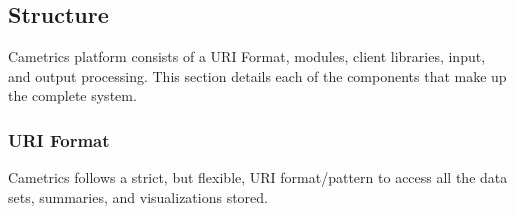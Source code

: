 \documentclass[10pt,a4paper,english]{article}
\begin{document}

\hypertarget{structure}{}
\subsection*{Structure}
\label{structure}

Cametrics platform consists of a URI Format, modules, client libraries, input, and output processing. This section details each of the components that make up the complete system.



\hypertarget{uri-format}{}
\subsubsection*{URI Format}
\label{uri-format}

Cametrics follows a strict, but flexible, URI format/pattern to access all the data sets, summaries, and visualizations stored.
\end{document}
